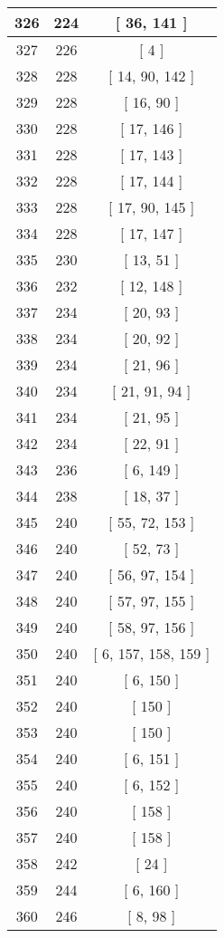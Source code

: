 \begin{center}
\begin{longtable}[H]{|| c c c ||}
\hline
326 & 224 & [ 36, 141 ] \\ 
\hline
327 & 226 & [ 4 ] \\ 
\hline
328 & 228 & [ 14, 90, 142 ] \\ 
\hline
329 & 228 & [ 16, 90 ] \\ 
\hline
330 & 228 & [ 17, 146 ] \\ 
\hline
331 & 228 & [ 17, 143 ] \\ 
\hline
332 & 228 & [ 17, 144 ] \\ 
\hline
333 & 228 & [ 17, 90, 145 ] \\ 
\hline
334 & 228 & [ 17, 147 ] \\ 
\hline
335 & 230 & [ 13, 51 ] \\ 
\hline
336 & 232 & [ 12, 148 ] \\ 
\hline
337 & 234 & [ 20, 93 ] \\ 
\hline
338 & 234 & [ 20, 92 ] \\ 
\hline
339 & 234 & [ 21, 96 ] \\ 
\hline
340 & 234 & [ 21, 91, 94 ] \\ 
\hline
341 & 234 & [ 21, 95 ] \\ 
\hline
342 & 234 & [ 22, 91 ] \\ 
\hline
343 & 236 & [ 6, 149 ] \\ 
\hline
344 & 238 & [ 18, 37 ] \\ 
\hline
345 & 240 & [ 55, 72, 153 ] \\ 
\hline
346 & 240 & [ 52, 73 ] \\ 
\hline
347 & 240 & [ 56, 97, 154 ] \\ 
\hline
348 & 240 & [ 57, 97, 155 ] \\ 
\hline
349 & 240 & [ 58, 97, 156 ] \\ 
\hline
350 & 240 & [ 6, 157, 158, 159 ] \\ 
\hline
351 & 240 & [ 6, 150 ] \\ 
\hline
352 & 240 & [ 150 ] \\ 
\hline
353 & 240 & [ 150 ] \\ 
\hline
354 & 240 & [ 6, 151 ] \\ 
\hline
355 & 240 & [ 6, 152 ] \\ 
\hline
356 & 240 & [ 158 ] \\ 
\hline
357 & 240 & [ 158 ] \\ 
\hline
358 & 242 & [ 24 ] \\ 
\hline
359 & 244 & [ 6, 160 ] \\ 
\hline
360 & 246 & [ 8, 98 ] \\ 

\end{longtable}
\end{center}

